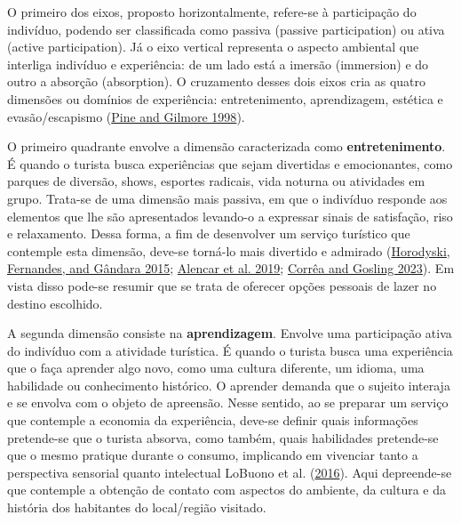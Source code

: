 \documentclass[preprint, 3p,
authoryear]{elsarticle} %
\begin{document}
O primeiro dos eixos, proposto horizontalmente, refere-se à participação
do indivíduo, podendo ser classificada como passiva (passive
participation) ou ativa (active participation). Já o eixo vertical
representa o aspecto ambiental que interliga indivíduo e experiência: de
um lado está a imersão (immersion) e do outro a absorção (absorption). O
cruzamento desses dois eixos cria as quatro dimensões ou domínios de
experiência: entretenimento, aprendizagem, estética e evasão/escapismo
(\protect\hyperlink{ref-pine1999}{Pine and Gilmore 1998}).

O primeiro quadrante envolve a dimensão caracterizada como
\textbf{entretenimento}. É quando o turista busca experiências que sejam
divertidas e emocionantes, como parques de diversão, shows, esportes
radicais, vida noturna ou atividades em grupo. Trata-se de uma dimensão
mais passiva, em que o indivíduo responde aos elementos que lhe são
apresentados levando-o a expressar sinais de satisfação, riso e
relaxamento. Dessa forma, a fim de desenvolver um serviço turístico que
contemple esta dimensão, deve-se torná-lo mais divertido e admirado
(\protect\hyperlink{ref-Horodyski2015}{Horodyski, Fernandes, and Gândara
2015}; \protect\hyperlink{ref-Alencar2019}{Alencar et al. 2019};
\protect\hyperlink{ref-Hott2023}{Corrêa and Gosling 2023}). Em vista
disso pode-se resumir que se trata de oferecer opções pessoais de lazer
no destino escolhido.

A segunda dimensão consiste na \textbf{aprendizagem}. Envolve uma
participação ativa do indivíduo com a atividade turística. É quando o
turista busca uma experiência que o faça aprender algo novo, como uma
cultura diferente, um idioma, uma habilidade ou conhecimento histórico.
O aprender demanda que o sujeito interaja e se envolva com o objeto de
apreensão. Nesse sentido, ao se preparar um serviço que contemple a
economia da experiência, deve-se definir quais informações pretende-se
que o turista absorva, como também, quais habilidades pretende-se que o
mesmo pratique durante o consumo, implicando em vivenciar tanto a
perspectiva sensorial quanto intelectual LoBuono et al.
(\protect\hyperlink{ref-LoBuono2016}{2016}). Aqui depreende-se que
contemple a obtenção de contato com aspectos do ambiente, da cultura e
da história dos habitantes do local/região visitado.
\end{document}
